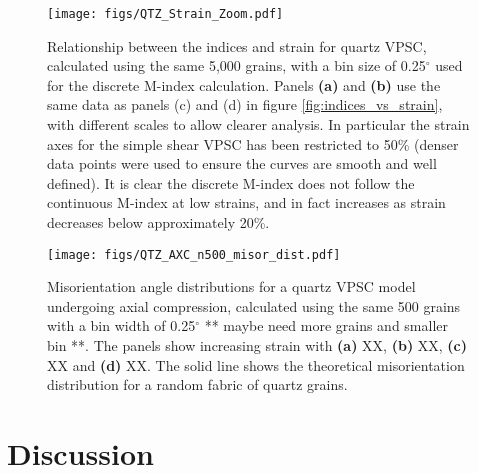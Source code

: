 \documentclass[a4paper,12pt]{report}
\numberwithin{equation}{chapter}
\begin{document}
\begin{figure}[h]
  \centering
    \texttt{[image: figs/QTZ\_Strain\_Zoom.pdf]}
  \caption[Relation of indices to strain (quartz)]{Relationship between the indices and strain for quartz VPSC, calculated using the same 5,000 grains, with a bin size of 0.25$^\circ$ used for the discrete M-index calculation. Panels \textbf{(a)} and \textbf{(b)} use the same data as panels (c) and (d) in figure \ref{fig:indices_vs_strain}, with different scales to allow clearer analysis. In particular the strain axes for the simple shear VPSC has been restricted to 50\% (denser data points were used to ensure the curves are smooth and well defined). It is clear the discrete M-index does not follow the continuous M-index at low strains, and in fact increases as strain decreases below approximately 20\%.}
  \label{fig:indices_vs_strain_qtz}
\end{figure} 

\begin{figure}[h]
  \centering
    \texttt{[image: figs/QTZ\_AXC\_n500\_misor\_dist.pdf]}
  \caption[Misorientation angle distribution (quartz)]{Misorientation angle distributions for a quartz VPSC model undergoing axial compression, calculated using the same 500 grains with a bin width of 0.25$^{\circ}$ ** maybe need more grains and smaller bin **. The panels show increasing strain with \textbf{(a)} XX, \textbf{(b)} XX, \textbf{(c)} XX and \textbf{(d)} XX. The solid line shows the theoretical misorientation distribution for a random fabric of quartz grains.} 
  \label{fig:qtz_misorientation_dist}
\end{figure} 

 
\chapter{Discussion}
\vspace{-1cm}
\end{document}
